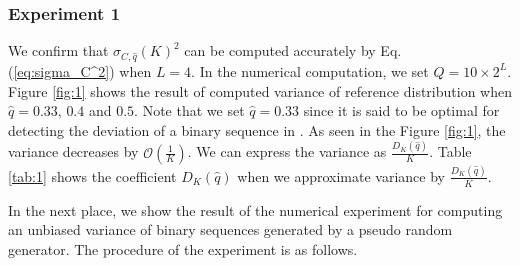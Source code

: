 \documentclass[dvipdfmx,english]{ampmt} %
\begin{document}
\subsubsection{Experiment 1}
%
%
We confirm that $\sigma_{C,\hat{q}} (K)^2$ can be computed accurately by Eq. (\ref{eq:sigma_C^2}) when $L=4$. In the numerical computation, we set $Q=10 \times 2^L$.
%
Figure \ref{fig:1} shows the result of computed variance of reference distribution when $\hat{q}=0.33,\, 0.4$ and $0.5$. Note that we set $\hat{q}=0.33$ since it is said to be optimal for detecting the deviation of a binary sequence in \cite{yamamoto2016highly}. As seen in the Figure \ref{fig:1}, the variance decreases by $\mathcal{O}(\frac{1}{K})$. We can express the variance as $\frac{D_K(\hat{q})}{K}$. Table \ref{tab:1} shows the coefficient $D_K(\hat{q})$ when we approximate variance by $\frac{D_K(\hat{q})}{K}$. 
\par
In the next place, we show the result of the numerical experiment for computing an unbiased variance of binary sequences generated by a pseudo random generator. The procedure of the experiment is as follows.
%
\end{document}
